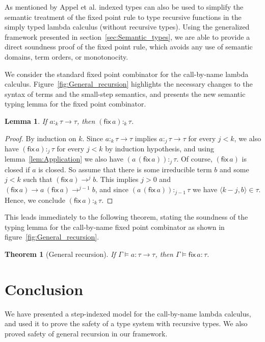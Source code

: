 \documentclass[10pt,a4paper,draft,twocolumn]{article}
\theoremstyle{definition}
\theoremstyle{plain}
\newtheorem{lemma}[definition]{Lemma}
\newtheorem{theorem}[definition]{Theorem}
\newcommand{\app}[2]{\ensuremath{{#1}\,{#2}}}
\newcommand{\fix}[1]{\ensuremath{\mathsf{fix}\,{#1}}}
\newcommand{\pair}[1]{\ensuremath{\langle{#1}\rangle}}
\begin{document}
As mentioned by Appel et al. \cite{Appel01} indexed types can also be used to simplify the semantic treatment of the
fixed point rule to type recursive functions in the simply typed lambda calculus (without recursive types). Using the
generalized framework presented in section~\ref{sec:Semantic_types}, we are able to provide a direct soundness proof
of the fixed point rule, which avoids any use of semantic domains, term orders, or monotonocity.
\begin{figure*}[htb]
  \centering
  \caption{General recursion}
  \label{fig:General_recursion}
\end{figure*}

We consider the standard fixed point combinator for the call-by-name lambda calculus.
Figure~\ref{fig:General_recursion} highlights the necessary changes to the syntax of terms
and the small-step semantics, and presents the new semantic typing lemma for the fixed point
combinator.

\begin{lemma}
  If $a :_k \tau \to \tau$, then $(\fix{a}) :_k \tau$.
\end{lemma}

\begin{proof}
  By induction on $k$. Since $a :_k \tau \to \tau$ implies $a :_j \tau \to \tau$ for every $j < k$,
  we also have $(\fix{a}) :_j \tau$ for every $j < k$ by induction hypothesis, and using lemma~\ref{lem:Application}
  we also have $(\app{a}{(\fix{a})}) :_j \tau$. Of course, $(\fix{a})$ is closed if $a$ is closed.
  So assume that there is some irreducible term $b$ and some $j < k$ such that $(\fix{a}) \to^j b$.
  This implies $j > 0$ and $(\fix{a}) \to \app{a}{(\fix{a})} \to^{j-1} b$, and since
  $(\app{a}{(\fix{a})}) :_{j-1} \tau$ we have $\pair{k-j,b} \in \tau$. Hence, we conclude
  $(\fix{a}) :_k \tau$.
\end{proof}

This leads immediately to the following theorem, stating the soundness of the typing lemma
for the call-by-name fixed point combinator as shown in figure~\ref{fig:General_recursion}.

\begin{theorem}[General recursion]
  If $\Gamma \models a : \tau \to \tau$, then $\Gamma \models \fix{a} : \tau$.
\end{theorem}


\section{Conclusion}
\label{sec:Conclusion}


We have presented a step-indexed model for the call-by-name lambda calculus, and used it to
prove the safety of a type system with recursive types. We also proved safety of general
recursion in our framework.




\end{document}
